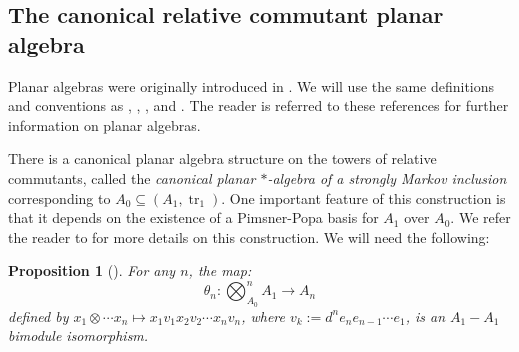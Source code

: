 \documentclass[11pt]{article}
\theoremstyle{plain}
\newtheorem{prop}[thm]{Proposition}
\theoremstyle{definition}
\newtheorem{defn}[thm]{Definition}
\DeclareMathOperator{\Tr}{Tr}
\DeclareMathOperator{\tr}{tr}
\newcommand{\nn}[1]{\textcolor{red}{[[#1]]}}
\begin{document}
%
%
%


\subsection{The canonical relative commutant planar algebra}%
\label{sec:StronglyMarkovPA}
\label{ssec:canonical}

Planar algebras were originally introduced in \cite{math.QA/9909027}. We will use the same definitions and conventions as \cite{MR2812459}, \cite{MR2679382}, \cite{jones}, and \cite{MR2972458}. The reader is referred to these references for further information on planar algebras. 

There is a canonical planar algebra structure on the towers of relative commutants, called the \textit{canonical planar $\ast$-algebra of a strongly Markov inclusion} corresponding to $A_0\subseteq (A_1,\tr_1)$. One important feature of this construction is that it depends on the existence of a Pimsner-Popa basis for $A_1$ over $A_0$. 
We refer the reader to \cite{MR2812459} for more details on this construction. 
We will need the following:
\begin{prop}[{\cite[Prop 2.25]{MR2812459}}]\label{iso}
For any $n$, the map:
\[
\theta_n: \bigotimes_{A_0}^{n}A_1 \rightarrow A_n
\]
defined by $x_1\otimes\cdots x_n \mapsto x_1v_1x_2v_2\cdots x_nv_n$, where $v_k:=d^ne_ne_{n-1}\cdots e_1$, is an $A_1-A_1$ bimodule isomorphism.
\end{prop}
\end{document}
